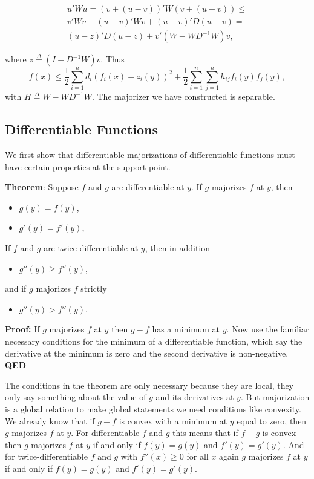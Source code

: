 \documentclass[
  12pt,
]{book}
\providecommand{\tightlist}{%
  \setlength{\itemsep}{0pt}\setlength{\parskip}{0pt}}
\begin{document}
\begin{multline*}
u'Wu=(v+(u-v))'W(v+(u-v))\leq \\v'Wv+(u-v)'Wv+(u-v)'D(u-v)=\\
(u-z)'D(u-z)+v'(W-WD^{-1}W)v,
\end{multline*}

where \(z\mathop{=}\limits^{\Delta}(I-D^{-1}W)v.\) Thus
\[
f(x)\leq\frac12\sum_{i=1}^n d_i(f_i(x)-z_i(y))^2+
\frac12\sum_{i=1}^n\sum_{j=1}^nh_{ij}f_i(y)f_j(y),
\]
with \(H\mathop{=}\limits^{\Delta}W-WD^{-1}W.\) The majorizer we have constructed is separable.

\hypertarget{differentiable-functions}{%
\subsection{Differentiable Functions}\label{differentiable-functions}}

We first show that differentiable majorizations of differentiable functions must have certain properties at the
support point.

\textbf{Theorem}: Suppose \(f\) and \(g\) are differentiable at \(y\). If \(g\) majorizes \(f\) at \(y\), then

\begin{itemize}
\tightlist
\item
  \(g(y)=f(y)\),
\item
  \(g'(y)=f'(y)\),
\end{itemize}

If \(f\) and \(g\) are twice differentiable at \(y\), then in addition

\begin{itemize}
\tightlist
\item
  \(g''(y)\geq f''(y)\),
\end{itemize}

and if \(g\) majorizes \(f\) strictly

\begin{itemize}
\tightlist
\item
  \(g''(y)>f''(y)\).
\end{itemize}

\textbf{Proof:}
If \(g\) majorizes \(f\) at \(y\) then \(g-f\) has a minimum at \(y\). Now use the
familiar necessary conditions for the minimum of a differentiable function, which say
the derivative at the minimum is zero and the second derivative is non-negative.
\textbf{QED}

The conditions in the theorem are only necessary because they are local, they only say something about the value of \(g\) and its derivatives at \(y\). But majorization is a global relation to make global statements we need conditions like convexity. We already know that if \(g-f\) is convex with a minimum at \(y\) equal to zero,
then \(g\) majorizes \(f\) at \(y\). For differentiable \(f\) and \(g\) this means that if \(f-g\) is convex
then \(g\) majorizes \(f\) at \(y\) if and only if \(f(y)=g(y)\) and \(f'(y)=g'(y)\). And for twice-differentiable \(f\) and \(g\) with \(f''(x)\geq 0\) for all \(x\) again \(g\) majorizes \(f\) at \(y\) if and only if \(f(y)=g(y)\) and \(f'(y)=g'(y)\).
\end{document}
